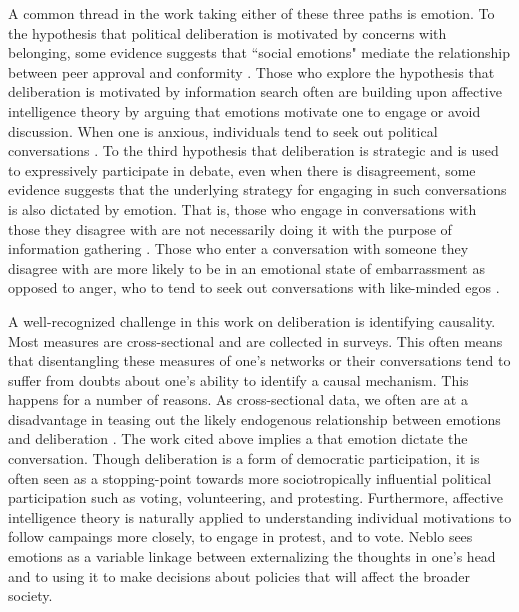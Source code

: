 \documentclass[12pt]{article}
\begin{document}
A common thread in the work taking either of these three paths is emotion. To the hypothesis that political deliberation is motivated by concerns with belonging, some evidence suggests that ``social emotions" mediate the relationship between peer approval and conformity \citep{suhay_2015_pb}. Those who explore the hypothesis that deliberation is motivated by information search often are building upon affective intelligence theory by arguing that emotions motivate one to engage or avoid discussion. When one is anxious, individuals tend to seek out political conversations \citep{mackuen_et-al_2010_ajps}. To the third hypothesis that deliberation is strategic and is used to expressively participate in debate, even when there is disagreement, some evidence suggests that the underlying strategy for engaging in such conversations is also dictated by emotion. That is, those who engage in conversations with those they disagree with are not necessarily doing it with the purpose of information gathering \citep{lyons_sokhey_2014_pc}. Those who enter a conversation with someone they disagree with are more likely to be in an emotional state of embarrassment as opposed to anger, who to tend to seek out conversations with like-minded egos \citep{wolak_sokhey_2022_apr}.

A well-recognized challenge in this work on deliberation is identifying causality. Most measures are cross-sectional and are collected in surveys. This often means that disentangling these measures of one's networks or their conversations tend to suffer from doubts about one's ability to identify a causal mechanism. This happens for a number of reasons. As cross-sectional data, we often are at a disadvantage in teasing out the likely endogenous relationship between emotions and deliberation \citep{sokhey_stapleton_2020_oh}. The work cited above implies a that emotion dictate the conversation. Though deliberation is a form of democratic participation, it is often seen as a stopping-point towards more sociotropically influential political participation such as voting, volunteering, and protesting. Furthermore, affective intelligence theory is naturally applied to understanding individual motivations to follow campaings more closely, to engage in protest, and to vote. Neblo \citeyearpar{neblo_2020_apsr} sees emotions as a variable linkage between externalizing the thoughts in one's head and to using it to make decisions about policies that will affect the broader society. 
\end{document}
